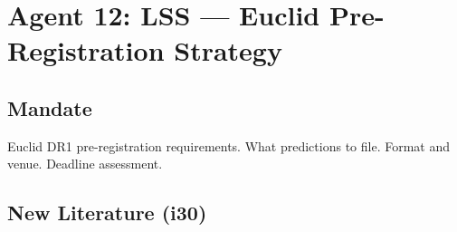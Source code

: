 \documentclass[11pt,a4paper]{article}
\begin{document}
\section{Agent 12: LSS --- Euclid Pre-Registration Strategy}

\subsection{Mandate}
Euclid DR1 pre-registration requirements. What predictions to file. Format and venue. Deadline assessment.

\subsection{New Literature (i30)}
\end{document}
